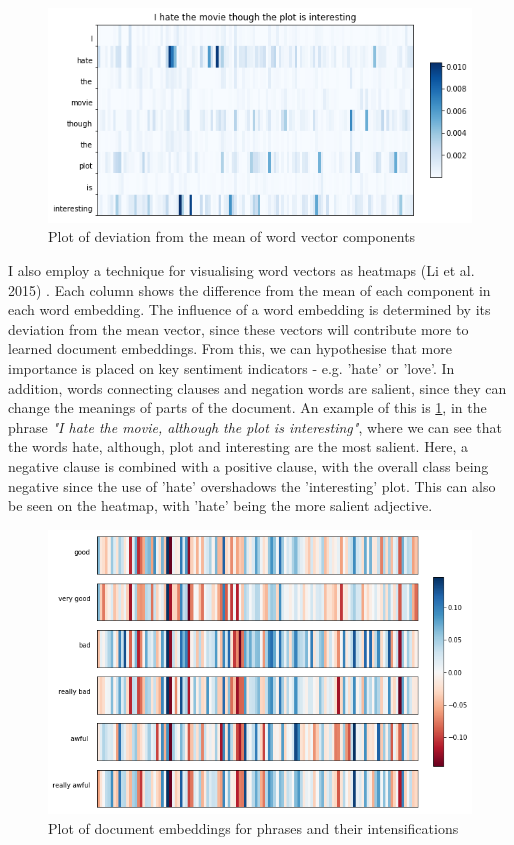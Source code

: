 \documentclass[a4paper]{article}
\begin{document}
\begin{multicols}{2}
\begin{figure}
  \centering
  \includegraphics[width=\textwidth,height=\textheight,keepaspectratio]{figs/variance_plot.png}
  \caption{Plot of deviation from the mean of word vector components}
  \label{fig:var-fig}
\end{figure}

I also employ a technique for visualising word vectors as heatmaps (Li et al. 2015) \cite{viz}. Each column shows the difference from the mean of each component in each word embedding. The influence of a word embedding is determined by its deviation from the mean vector, since these vectors will contribute more to learned document embeddings. From this, we can hypothesise that more importance is placed on key sentiment indicators - e.g. 'hate' or 'love'. In addition, words connecting clauses and negation words are salient, since they can change the meanings of parts of the document. An example of this is \ref{fig:var-fig}, in the phrase \textit{"I hate the movie, although the plot is interesting"}, where we can see that the words hate, although, plot and interesting are the most salient. Here, a negative clause is combined with a positive clause, with the overall class being negative since the use of 'hate' overshadows the 'interesting' plot. This can also be seen on the heatmap, with 'hate' being the more salient adjective.

\begin{figure}
  \centering
  \includegraphics[width=\textwidth,height=\textheight,keepaspectratio]{figs/intense.png}
  \caption{Plot of document embeddings for phrases and their intensifications}
  \label{fig:intense-fig}
\end{figure}


\end{multicols}
\end{document}
